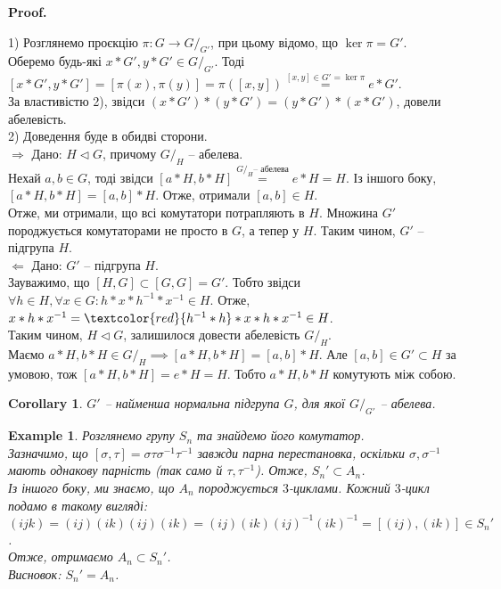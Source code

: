 \documentclass[a4paper, 10pt]{article}
\makeatletter
\def\rightproof{$\boxed{\Rightarrow}$ }
\def\leftproof{$\boxed{\Leftarrow}$ }
\theoremstyle{theoremdd}
\theoremstyle{theoremdd}
\theoremstyle{theoremdd}
\theoremstyle{theoremdd}
\theoremstyle{theoremdd}
\newtheorem{example}[theorem]{Example}
\theoremstyle{theoremdd}
\theoremstyle{theoremdd}
\theoremstyle{theoremdd}
\theoremstyle{theoremdd}
\theoremstyle{theoremdd}
\theoremstyle{theoremdd}
\theoremstyle{theoremdd}
\theoremstyle{theoremdd}
\theoremstyle{theoremdd}
\newtheorem{corollary}[theorem]{Corollary}
\theoremstyle{theoremdd}
\renewenvironment{proof}[1][Proof.\\]{\par
\pushQED{\hfill \qed}%
\normalfont \topsep6\p@\@plus6\p@\relax
\trivlist
\item\relax
{\bfseries
#1\@addpunct{.}}\hspace\labelsep\ignorespaces
}{%
\popQED\endtrivlist\@endpefalse
}
\makeatother
\begin{document}
\begin{proof}
1) Розглянемо проєкцію $\pi \colon G \to G/_{G'}$, при цьому відомо, що $\ker \pi = G'$. Оберемо будь-які $x*G', y*G' \in G/_{G'}$. Тоді\\
$[x*G',y*G'] = [\pi(x), \pi(y)] = \pi([x,y]) \overset{[x,y] \in G' = \ker \pi}{=} e*G'$.\\
За властивістю 2), звідси $(x*G')*(y*G') = (y*G')*(x*G')$, довели абелевість.
\bigskip \\
2) Доведення буде в обидві сторони.\\
\rightproof Дано: $H \triangleleft G$, причому $G/_H$ -- абелева.\\
Нехай $a,b \in G$, тоді звідси $[a*H,b*H] \overset{G/_H \text{-- абелева}}{=} e*H = H$. Із іншого боку, $[a*H,b*H] = [a,b]*H$. Отже, отримали $[a,b] \in H$.\\
Отже, ми отримали, що всі комутатори потрапляють в $H$. Множина $G'$ породжується комутаторами не просто в $G$, а тепер у $H$. Таким чином, $G'$ -- підгрупа $H$.
\bigskip \\
\leftproof Дано: $G'$ -- підгрупа $H$.\\
Зауважимо, що $[H,G] \subset [G,G] = G'$. Тобто звідси $\forall h \in H, \forall x \in G: h*x*h^{-1}*x^{-1} \in H$. Отже, $x*h*x^{-1} = \textcolor{red}{h^{-1}*h}*x*h*x^{-1} \in H$.\\
Таким чином, $H \triangleleft G$, залишилося довести абелевість $G/_H$.\\
Маємо $a*H,b*H \in G/_H \implies [a*H,b*H] = [a,b]*H$. Але $[a,b] \in G' \subset H$ за умовою, тож $[a*H,b*H] = e*H = H$. Тобто $a*H,b*H$ комутують між собою.
\end{proof}

\begin{corollary}
$G'$ -- найменша нормальна підгрупа $G$, для якої $G/_{G'}$ -- абелева.
\end{corollary}

\begin{example}
Розглянемо групу $S_n$ та знайдемо його комутатор.\\
Зазначимо, що $[\sigma,\tau] = \sigma \tau \sigma^{-1} \tau^{-1}$ завжди парна перестановка, оскільки $\sigma, \sigma^{-1}$ мають однакову парність (так само й $\tau, \tau^{-1}$). Отже, $S_n' \subset A_n$.\\
Із іншого боку, ми знаємо, що $A_n$ породжується $3$-циклами. Кожний $3$-цикл подамо в такому вигляді:\\
$(ijk) = (ij)(ik)(ij)(ik) = (ij)(ik)(ij)^{-1}(ik)^{-1} = [(ij),(ik)] \in S_n'$.\\
Отже, отримаємо $A_n \subset S_n'$.\\
Висновок: $S_n' = A_n$.
\end{example}
\end{document}
